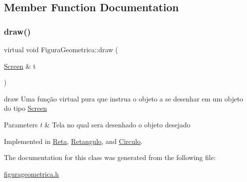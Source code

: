 \subsection{Member Function Documentation}
\mbox{\label{class_figura_geometrica_a8ee8dedc060b6059a805ea091aef2c41}} 
\subsubsection{\texorpdfstring{draw()}{draw()}}
{\footnotesize\ttfamily virtual void Figura\+Geometrica\+::draw (\begin{DoxyParamCaption}\item[{\mbox{\hyperlink{class_screen}{Screen}} \&}]{t }\end{DoxyParamCaption})\hspace{0.3cm}{\ttfamily [pure virtual]}}



draw Uma função virtual pura que instrua o objeto a se desenhar em um objeto do tipo \mbox{\hyperlink{class_screen}{Screen}} 


\begin{DoxyParams}{Parameters}
{\em t} & Tela no qual sera desenhado o objeto desejado \\
\hline
\end{DoxyParams}


Implemented in \mbox{\hyperlink{class_reta_ac2e9805183cd474b62bffd8b032cd780}{Reta}}, \mbox{\hyperlink{class_retangulo_ac088dd6d3f4f3d3f80363a868c2e74f1}{Retangulo}}, and \mbox{\hyperlink{class_circulo_a593787d6e0618c2eded23e8839e7bea6}{Circulo}}.



The documentation for this class was generated from the following file\+:\begin{DoxyCompactItemize}
\item 
\mbox{\hyperlink{figurageometrica_8h}{figurageometrica.\+h}}\end{DoxyCompactItemize}
